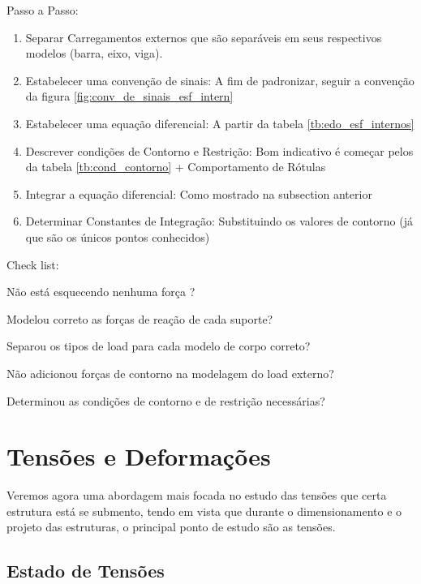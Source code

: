 \documentclass{article}
\begin{document}
\begin{minipage}[t]{.7\textwidth}
    Passo a Passo:
    \begin{enumerate}\addtocounter{enumi}{-1}\tiny
        \item Separar Carregamentos externos que são separáveis em seus respectivos modelos (barra, eixo, viga).
        \item Estabelecer uma convenção de sinais: A fim de padronizar, seguir a convenção da figura \ref{fig:conv_de_sinais_esf_intern}
        \item Estabelecer uma equação diferencial: A partir da tabela \ref{tb:edo_esf_internos}
        \item Descrever condições de Contorno e Restrição: Bom indicativo é começar pelos da tabela \ref{tb:cond_contorno} + Comportamento de Rótulas
        \item Integrar a equação diferencial: Como mostrado na subsection anterior
        \item Determinar Constantes de Integração: Substituindo os valores de contorno (já que são os únicos pontos conhecidos)
    \end{enumerate}
\end{minipage}\hfill
\begin{minipage}[t]{.3\textwidth}
    Check list:
    \begin{todolist}\tiny
        \item Não está esquecendo nenhuma força ?
        \item Modelou correto as forças de reação de cada suporte?
        \item Separou os tipos de load para cada modelo de corpo correto?
        \item Não adicionou forças de contorno na modelagem do load externo?
        \item Determinou as condições de contorno e de restrição necessárias?
    \end{todolist}
\end{minipage}


\section{Tensões e Deformações}
Veremos agora uma abordagem mais focada no estudo das tensões que certa estrutura está se submento, tendo em vista que durante o dimensionamento e o projeto das estruturas, o principal ponto de estudo são as tensões.

\subsection{Estado de Tensões}
\end{document}
